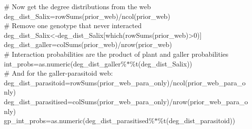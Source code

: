 \documentclass[12pt]{article}
\begin{document}
      \vspace{12pt}
      \begin{em}
      \noindent \hspace{2pt}\# Now get the degree distributions from the web\\
      \noindent \hspace{2pt}deg\_dist\_Salix=rowSums(prior\_web)/ncol(prior\_web)\\
      \vspace{4pt}
      \noindent \hspace{2pt}\# Remove one genotype that never interacted\\
      \noindent \hspace{2pt}deg\_dist\_Salix\textless-deg\_dist\_Salix[which(rowSums(prior\_web)\textgreater0)]\\
      \noindent \hspace{2pt}deg\_dist\_galler=colSums(prior\_web)/nrow(prior\_web)\\
      \vspace{4pt}
      \noindent \hspace{2pt}\# Interaction probabilities are the product of plant and galler probabilities\\
      \noindent \hspace{2pt}int\_probs=as.numeric(deg\_dist\_galler\%$*$\%t(deg\_dist\_Salix))\\
      \vspace{4pt}
      \noindent \hspace{2pt}\# And for the galler-parasitoid web:\\
      \noindent \hspace{2pt}deg\_dist\_parasitoid=rowSums(prior\_web\_para\_only)/ncol(prior\_web\_para\_only)\\
      \noindent \hspace{2pt}deg\_dist\_parasitised=colSums(prior\_web\_para\_only)/nrow(prior\_web\_para\_only)\\
      \noindent \hspace{2pt}gp\_int\_probs=as.numeric(deg\_dist\_parasitised\%$*$\%t(deg\_dist\_parasitoid))\\
      \end{em}



\end{document}
